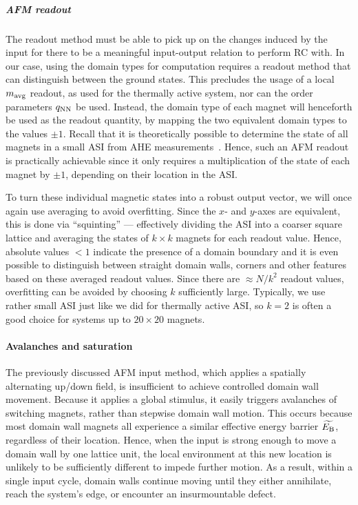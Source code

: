 \subparagraph{AFM readout}
The readout method must be able to pick up on the changes induced by the input for there to be a meaningful input-output relation to perform RC with.
In our case, using the domain types for computation requires a readout method that can distinguish between the ground states.
This precludes the usage of a local $m_\mathrm{avg}$ readout, as used for the thermally active system, nor can the order parameters $q_\mathrm{NN}$ be used.
Instead, the domain type of each magnet will henceforth be used as the readout quantity, by mapping the two equivalent domain types to the values $\pm 1$.
Recall that it is theoretically possible to determine the state of all magnets in a small ASI from AHE measurements~\cite[Supp. 7]{KUR-24}.
Hence, such an AFM readout is practically achievable since it only requires a multiplication of the state of each magnet by $\pm 1$, depending on their location in the ASI. \par
To turn these individual magnetic states into a robust output vector, we will once again use averaging to avoid overfitting.
Since the $x$- and $y$-axes are equivalent, this is done via ``squinting'' --- effectively dividing the ASI into a coarser square lattice and averaging the states of $k \times k$ magnets for each readout value.
Hence, absolute values $<1$ indicate the presence of a domain boundary and it is even possible to distinguish between straight domain walls, corners and other features based on these averaged readout values.
Since there are $\approx N/k^2$ readout values, overfitting can be avoided by choosing $k$ sufficiently large.
Typically, we use rather small ASI just like we did for thermally active ASI, so $k=2$ is often a good choice for systems up to $20 \times 20$ magnets.

\paragraph{Avalanches and saturation}
The previously discussed AFM input method, which applies a spatially alternating up/down field, is insufficient to achieve controlled domain wall movement.
Because it applies a global stimulus, it easily triggers avalanches of switching magnets, rather than stepwise domain wall motion.
This occurs because most domain wall magnets all experience a similar effective energy barrier $\widetilde{E_\mathrm{B}}$, regardless of their location.
Hence, when the input is strong enough to move a domain wall by one lattice unit, the local environment at this new location is unlikely to be sufficiently different to impede further motion.
As a result, within a single input cycle, domain walls continue moving until they either annihilate, reach the system's edge, or encounter an insurmountable defect. \par

